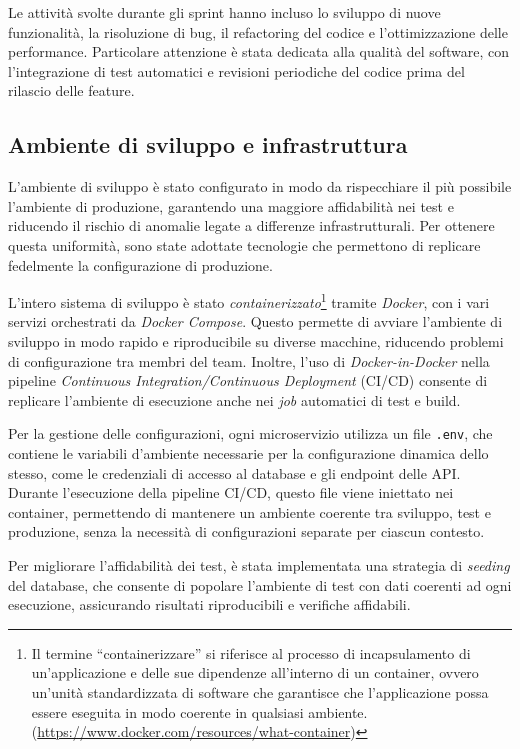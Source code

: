 Le attività svolte durante gli sprint hanno incluso lo sviluppo di nuove funzionalità, la risoluzione di bug, il refactoring del codice e l'ottimizzazione delle performance. Particolare attenzione è stata dedicata alla qualità del software, con l'integrazione di test automatici e revisioni periodiche del codice prima del rilascio delle feature.

\subsection{Ambiente di sviluppo e infrastruttura}
L'ambiente di sviluppo è stato configurato in modo da rispecchiare il più possibile l'ambiente di produzione, garantendo una maggiore affidabilità nei test e riducendo il rischio di anomalie legate a differenze infrastrutturali. Per ottenere questa uniformità, sono state adottate tecnologie che permettono di replicare fedelmente la configurazione di produzione.

L'intero sistema di sviluppo è stato \textit{containerizzato}\footnote{Il termine ``containerizzare'' si riferisce al processo di incapsulamento di un'applicazione e delle sue dipendenze all'interno di un container, ovvero un'unità standardizzata di software che garantisce che l'applicazione possa essere eseguita in modo coerente in qualsiasi ambiente. (\url{https://www.docker.com/resources/what-container})} tramite \textit{Docker}, con i vari servizi orchestrati da \textit{Docker Compose}. Questo permette di avviare l’ambiente di sviluppo in modo rapido e riproducibile su diverse macchine, riducendo problemi di configurazione tra membri del team. Inoltre, l'uso di \textit{Docker-in-Docker} nella pipeline \textit{Continuous Integration/Continuous Deployment} (CI/CD) consente di replicare l’ambiente di esecuzione anche nei \textit{job} automatici di test e build.

Per la gestione delle configurazioni, ogni microservizio utilizza un file \texttt{.env}, che contiene le variabili d’ambiente necessarie per la configurazione dinamica dello stesso, come le credenziali di accesso al database e gli endpoint delle API. Durante l’esecuzione della pipeline CI/CD, questo file viene iniettato nei container, permettendo di mantenere un ambiente coerente tra sviluppo, test e produzione, senza la necessità di configurazioni separate per ciascun contesto.

Per migliorare l'affidabilità dei test, è stata implementata una strategia di \textit{seeding} del database, che consente di popolare l’ambiente di test con dati coerenti ad ogni esecuzione, assicurando risultati riproducibili e verifiche affidabili.

